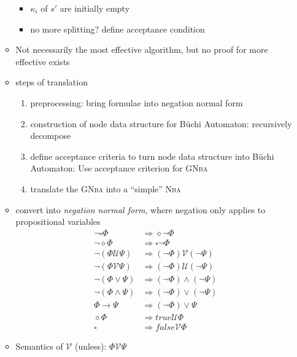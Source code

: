 \documentclass[a4paper, 10pt]{article}
\begin{document}
\begin{itemize}
\begin{itemize}
\begin{itemize}
            \item $\kappa_i$ of $s'$ are initially empty
            \item no more splitting? define acceptance condition
        \end{itemize}
        \item Not necessarily the most effective algorithm, but no proof for more effective exists
        \item steps of translation
        \begin{enumerate}
            \item preprocessing: bring formulae into negation normal form
            \item construction of node data structure for Büchi Automaton: recursively decompose
            \item define acceptance criteria to turn node data structure into Büchi Automaton: Use acceptance criterion for \textsc{GNba}
            \item translate the \textsc{GNba} into a ``simple'' \textsc{Nba}
        \end{enumerate}
        \item convert into \emph{negation normal form}, where negation only applies to propositional variables
        \begin{align*}
        \neg\square\Phi             &\Rightarrow \diamond\neg\Phi \\
        \neg\diamond\Phi            &\Rightarrow \square\neg\Phi \\
        \neg(\Phi \mathcal{U}\Psi)  &\Rightarrow (\neg\Phi)\mathcal{V}(\neg\Psi) \\
        \neg(\Phi \mathcal{V}\Psi)  &\Rightarrow (\neg\Phi)\mathcal{U}(\neg\Psi) \\
        \neg(\Phi\vee\Psi)          &\Rightarrow (\neg\Phi)\wedge(\neg\Psi) \\
        \neg(\Phi\wedge\Psi)        &\Rightarrow (\neg\Phi)\vee(\neg\Psi) \\
        \Phi\to\Psi                 &\Rightarrow (\neg\Phi)\vee\Psi \\
        \diamond\Phi                &\Rightarrow  true \mathcal{U}\Phi \\
        \square                     &\Rightarrow  false \mathcal{V}\Phi
        \end{align*}
        \item Semantics of $\mathcal{V}$ (unless): $\Phi \mathcal{V} \Psi$ \follows
        \begin{itemize}

\end{itemize}
\end{itemize}
\end{itemize}
\end{document}
